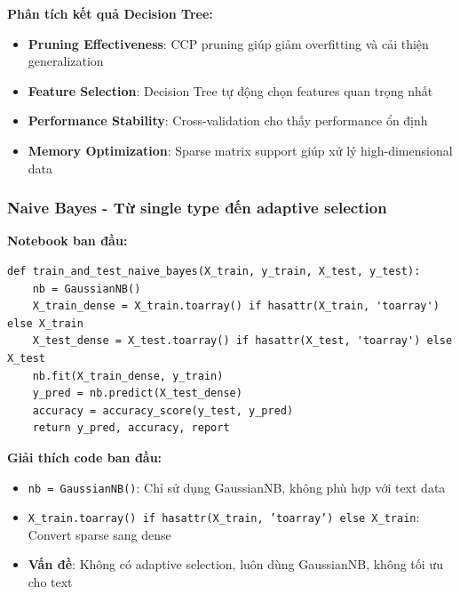 \textbf{Phân tích kết quả Decision Tree:}
\begin{itemize}
    \item \textbf{Pruning Effectiveness}: CCP pruning giúp giảm overfitting và cải thiện generalization
    \item \textbf{Feature Selection}: Decision Tree tự động chọn features quan trọng nhất
    \item \textbf{Performance Stability}: Cross-validation cho thấy performance ổn định
    \item \textbf{Memory Optimization}: Sparse matrix support giúp xử lý high-dimensional data
\end{itemize}

\subsubsection{Naive Bayes - Từ single type đến adaptive selection}

\textbf{Notebook ban đầu:}
\begin{verbatim}
def train_and_test_naive_bayes(X_train, y_train, X_test, y_test):
    nb = GaussianNB()
    X_train_dense = X_train.toarray() if hasattr(X_train, 'toarray') else X_train
    X_test_dense = X_test.toarray() if hasattr(X_test, 'toarray') else X_test
    nb.fit(X_train_dense, y_train)
    y_pred = nb.predict(X_test_dense)
    accuracy = accuracy_score(y_test, y_pred)
    return y_pred, accuracy, report
\end{verbatim}

\textbf{Giải thích code ban đầu:}
\begin{itemize}
    \item \texttt{nb = GaussianNB()}: Chỉ sử dụng GaussianNB, không phù hợp với text data
    \item \texttt{X\_train.toarray() if hasattr(X\_train, 'toarray') else X\_train}: Convert sparse sang dense
    \item \textbf{Vấn đề}: Không có adaptive selection, luôn dùng GaussianNB, không tối ưu cho text
\end{itemize}

